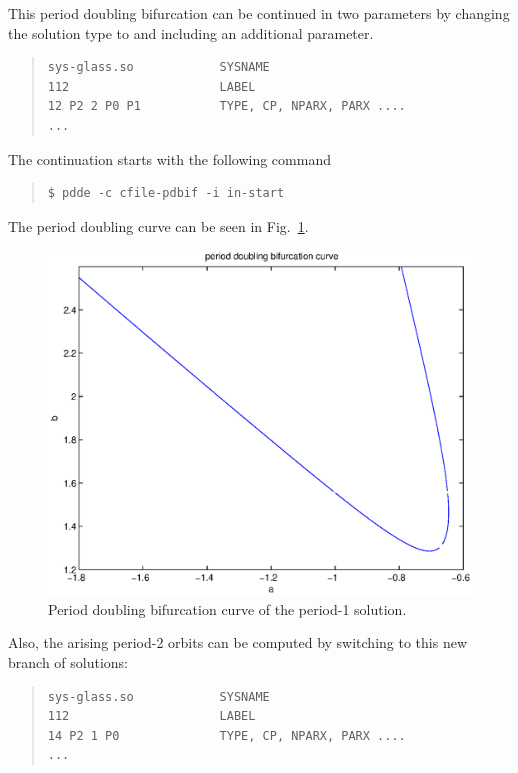 \documentclass[10pt,a4paper]{ddedoc}
\begin{document}
This period doubling bifurcation can be continued in two parameters 
by changing the solution type to  and including an additional parameter.
{ \small \begin{quote} \begin{lstlisting}[basicstyle=\tt,frame=single]
sys-glass.so            SYSNAME
112                     LABEL
12 P2 2 P0 P1           TYPE, CP, NPARX, PARX ....
...
\end{lstlisting} \end{quote} } \noindent
The continuation starts with the following command
{ \small \begin{quote} \begin{lstlisting}[basicstyle=\tt,frame=single]
$ pdde -c cfile-pdbif -i in-start
\end{lstlisting} \end{quote} } \noindent
The period doubling curve can be seen in Fig.\ \ref{pdbif}.
\begin{figure}
\begin{center}
\includegraphics[scale=0.6]{fig/pdbif2.eps}
\end{center}
\caption{Period doubling bifurcation curve of the period-1 solution.}
\label{pdbif}
\end{figure}
Also, the arising period-2 orbits can be computed by switching to this new branch of solutions:
{ \small \begin{quote} \begin{lstlisting}[basicstyle=\tt,frame=single]
sys-glass.so            SYSNAME
112                     LABEL
14 P2 1 P0              TYPE, CP, NPARX, PARX ....
...
\end{lstlisting} \end{quote} } \noindent
\end{document}
